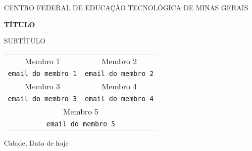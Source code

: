 \thispagestyle{empty}

\begin{center}
    
\large{CENTRO FEDERAL DE EDUCAÇÃO TECNOLÓGICA DE MINAS GERAIS}

\vspace{8cm}

\textbf{\Large{TÍTULO}}

\vspace{0.5cm}

\large{SUBTÍTULO}

\vspace{6cm}

\begin{longtable}{ c c }
    Membro 1 & 
    Membro 2 \\ 
    
    \texttt{email do membro 1} &
    \texttt{email do membro 2} \\
    
    Membro 3 & 
    Membro 4 \\ 
    
    \texttt{email do membro 3} &
    \texttt{email do membro 4} \\
    
    \multicolumn{2}{c}{
        Membro 5
    }\\
    
    \multicolumn{2}{c}{
        \texttt{email do membro 5}
    }\\
    
\end{longtable}

\vspace{1cm}

Cidade, Data de hoje
\end{center}

\newpage

\tableofcontents

\newpage

\listoffigures

\newpage

\listoftables

\newpage

